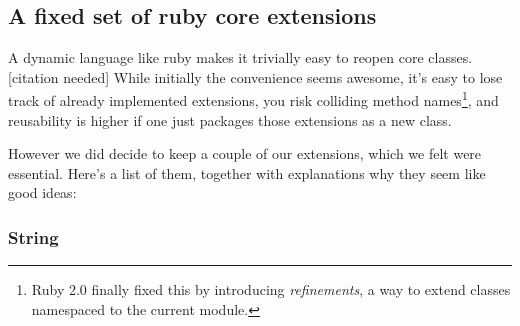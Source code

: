 \subsection{A fixed set of ruby core extensions}

A dynamic language like ruby makes it trivially easy to reopen core classes. [citation needed] While initially the convenience seems awesome, it's easy to lose track of already implemented extensions, you risk colliding method names\footnote{Ruby 2.0 finally fixed this by introducing \emph{refinements}, a way to extend classes namespaced to the current module.}, and reusability is higher if one just packages those extensions as a new class.

However we did decide to keep a couple of our extensions, which we felt were essential. Here's a list of them, together with explanations why they seem like good ideas:

\subsubsection{String}

